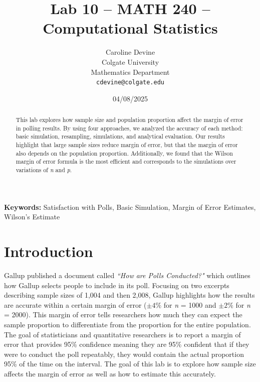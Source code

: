 \documentclass{article}\usepackage[]{graphicx}\usepackage[]{xcolor}
\begin{document}
\vspace{-1in}
\title{Lab 10 -- MATH 240 -- Computational Statistics}

\author{
  Caroline Devine \\
  Colgate University  \\
  Mathematics Department  \\
  {\tt cdevine@colgate.edu}
}

\date{04/08/2025}

\maketitle

\begin{multicols}{2}
\begin{abstract}
This lab explores how sample size and population proportion affect the margin of error in polling results. By using four approaches, we analyzed the accuracy of each method: basic simulation, resampling, simulations, and analytical evaluation. Our results highlight that large sample sizes reduce margin of error, but that the margin of error also depends on the population proportion. Additionally, we found that the Wilson margin of error formula is the most efficient and corresponds to the simulations over variations of \emph{n} and \emph{p}. 
\end{abstract}

\noindent \textbf{Keywords:} Satisfaction with Polls, Basic Simulation, Margin of Error Estimates, Wilson's Estimate

\section{Introduction}

Gallup published a document called \emph{``How are Polls Conducted?"} \citep{GallupPolls} which outlines how Gallup selects people to include in its poll. Focusing on two excerpts describing sample sizes of 1,004 and then 2,008, Gallup highlights how the results are accurate within a certain margin of error (\(\pm 4\% \) for \emph{n} = 1000 and \(\pm 2\% \) for \emph{n} = 2000). This margin of error tells researchers how much they can expect the sample proportion to differentiate from the proportion for the entire population. The goal of statisticians and quantitative researchers is to report a margin of error that provides 95\% confidence meaning they are 95\% confident that if they were to conduct the poll repeatably, they would contain the actual proportion 95\% of the time on the interval. The goal of this lab is to explore how sample size affects the margin of error as well as how to estimate this accurately. 


\end{multicols}
\end{document}

